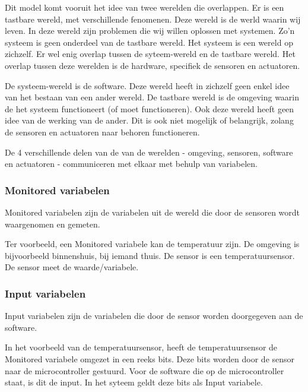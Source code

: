 \documentclass{article}
\begin{document}
		Dit model komt vooruit het idee van twee werelden die overlappen. Er is een tastbare wereld, met verschillende fenomenen. Deze wereld is de werld waarin wij leven. In deze wereld zijn problemen die wij willen oplossen met systemen. Zo'n systeem is geen onderdeel van de tastbare wereld. Het systeem is een wereld op zichzelf. Er wel enig overlap tussen de syteem-wereld en de tastbare wereld. Het overlap tussen deze werelden is de hardware, specifiek de sensoren en actuatoren.

		De systeem-wereld is de software. Deze wereld heeft in zichzelf geen enkel idee van het bestaan van een ander wereld. De tastbare wereld is de omgeving waarin de het systeem functioneert (of moet functioneren). Ook deze wereld heeft geen idee van de werking van de ander. Dit is ook niet mogelijk of belangrijk, zolang de sensoren en actuatoren naar behoren functioneren.

		De 4 verschillende delen van de van de werelden - omgeving, sensoren, software en actuatoren - communiceren met elkaar met behulp van variabelen.
		
			\subsubsection{Monitored variabelen}
			
			Monitored variabelen zijn de variabelen uit de wereld die door de sensoren wordt waargenomen en gemeten.
			
			Ter voorbeeld, een Monitored variabele kan de temperatuur zijn. De omgeving is bijvoorbeeld binnenshuis, bij iemand thuis. De sensor is een temperatuursensor. De sensor meet de waarde/variabele.
			
			\subsubsection{Input variabelen}
			
			Input variabelen zijn de variabelen die door de sensor worden doorgegeven aan de software.

			In het voorbeeld van de temperatuursensor, heeft de temperatuursensor de Monitored variabele omgezet in een reeks bits. Deze bits worden door de sensor naar de microcontroller gestuurd. Voor de software die op de microcontroller staat, is dit de input. In het syteem geldt deze bits als Input variabele.
			
\end{document}
